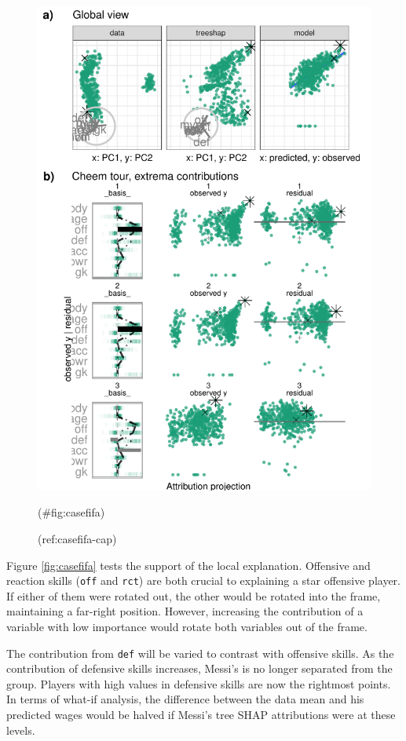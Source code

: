 \documentclass[
]{jss}
\begin{document}
\begin{CodeChunk}
\begin{figure}

{\centering \includegraphics[width=0.9\linewidth]{./figures/case_fifa} 

}

\caption[(ref:casefifa-cap)]{(ref:casefifa-cap)}(\#fig:casefifa)
\end{figure}
\end{CodeChunk}

Figure \ref{fig:casefifa} tests the support of the local explanation. Offensive and reaction skills (\texttt{off} and \texttt{rct}) are both crucial to explaining a star offensive player. If either of them were rotated out, the other would be rotated into the frame, maintaining a far-right position. However, increasing the contribution of a variable with low importance would rotate both variables out of the frame.

The contribution from \texttt{def} will be varied to contrast with offensive skills. As the contribution of defensive skills increases, Messi's is no longer separated from the group. Players with high values in defensive skills are now the rightmost points. In terms of what-if analysis, the difference between the data mean and his predicted wages would be halved if Messi's tree SHAP attributions were at these levels.
\end{document}
